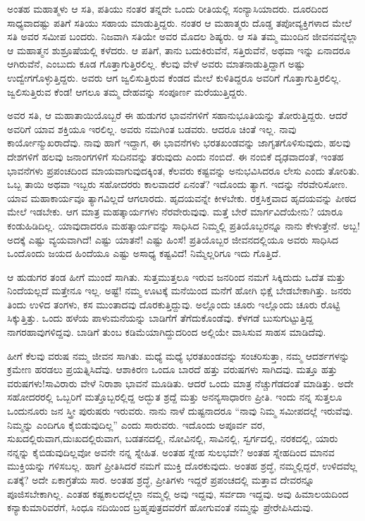 ಅಂತಹ ಮಹಾತ್ಮಳು ಆ ಸತಿ, ಪತಿಯು ನಂತರ ತನ್ನದೇ ಒಂದು ರೀತಿಯಲ್ಲಿ ಸಂನ್ಯಾಸಿಯಾದರು. ದೂರದಿಂದ ಸಾಧ್ಯವಾದಷ್ಟು ಪತಿಗೆ ಸತಿಯು ಸಹಾಯ ಮಾಡುತ್ತಿದ್ದರು. ನಂತರ ಆ ಮಹಾತ್ಮರು ದೊಡ್ಡ ತಪೋವ್ಯಕ್ತಿಗಳಾದ ಮೇಲೆ ಸತಿ ಅವರ ಸಮೀಪ ಬಂದರು. ನಿಜವಾಗಿ ಸತಿಯೇ ಅವರ ಮೊದಲ ಶಿಷ್ಯರು. ಆ ಸತಿ ತಮ್ಮ ಮುಂದಿನ ಜೀವನವನ್ನೆಲ್ಲಾ ಆ ಮಹಾತ್ಮನ ಶುಶ್ರೂಷೆಯಲ್ಲಿ ಕಳೆದರು. ಆ ಪತಿಗೆ, ತಾನು ಬದುಕಿರುವೆನೆ, ಸತ್ತಿರುವೆನೆ, ಅಥವಾ ಇನ್ನು ಏನಾದರೂ ಆಗಿರುವೆನೆ, ಎಂಬುದು ಕೂಡ ಗೊತ್ತಾಗುತ್ತಿರಲಿಲ್ಲ. ಕೆಲವು ವೇಳೆ ಅವರು ಮಾತನಾಡುತ್ತಿದ್ದಾಗ ಅಷ್ಟು ಉದ್ವೇಗಗೊಳ್ಳುತ್ತಿದ್ದರು. ಅವರು ಆಗ ಜ್ವಲಿಸುತ್ತಿರುವ ಕೆಂಡದ ಮೇಲೆ ಕುಳಿತಿದ್ದರೂ ಅವರಿಗೆ ಗೊತ್ತಾಗುತ್ತಿರಲಿಲ್ಲ. ಜ್ವಲಿಸುತ್ತಿರುವ ಕೆಂಡ! ಆಗಲೂ ತಮ್ಮ ದೇಹವನ್ನು ಸಂಪೂರ್ಣ ಮರೆಯುತ್ತಿದ್ದರು.

ಅವರ ಸತಿ, ಆ ಮಹಾತಾಯಿಯೊಬ್ಬರೆ ಈ ಹುಡುಗರ ಭಾವನೆಗಳಿಗೆ ಸಹಾನುಭೂತಿಯನ್ನು ತೋರುತ್ತಿದ್ದರು. ಆದರೆ ಅವರಿಗೆ ಯಾವ ಶಕ್ತಿಯೂ ಇರಲಿಲ್ಲ. ಅವರು ನಮಗಿಂತ ಬಡವರು. ಆದರೂ ಚಿಂತೆ ಇಲ್ಲ. ನಾವು ಕಾರ್ಯೋನ್ಮುಖರಾದೆವು. ನಾವು ಹಾಗೆ ಇದ್ದಾಗ, ಈ ಭಾವನೆಗಳು ಭರತಖಂಡವನ್ನು ಜಾಗೃತಗೊಳಿಸುವುದು, ಹಲವು ದೇಶಗಳಿಗೆ ಹಲವು ಜನಾಂಗಗಳಿಗೆ ಸುದಿನವನ್ನು ತರುವುದು ಎಂದು ನಂಬಿದೆ. ಈ ನಂಬಿಕೆ ದೃಢವಾದಂತೆ, ಇಂತಹ ಭಾವನೆಗಳು ಪ್ರಪಂಚದಿಂದ ಮಾಯವಾಗುವುದಕ್ಕಿಂತ, ಕೆಲವರು ಕಷ್ಟವನ್ನು ಅನುಭವಿಸಿದರೂ ಲೇಸು ಎಂದು ತೋರಿತು. ಒಬ್ಬ ತಾಯಿ ಅಥವಾ ಇಬ್ಬರು ಸಹೋದರರು ಕಾಲವಾದರೆ ಏನಂತೆ? ಇದೊಂದು ತ್ಯಾಗ. ಇದನ್ನು ನೆರವೇರಿಸೋಣ. ಯಾವ ಮಹಾಕಾರ್ಯವೂ ತ್ಯಾಗವಿಲ್ಲದೆ ಆಗಲಾರದು. ಹೃದಯವನ್ನೇ ಕೀಳಬೇಕು. ರಕ್ತಸಿಕ್ತವಾದ ಹೃದಯವನ್ನು ಪೀಠದ ಮೇಲೆ ಇಡಬೇಕು. ಆಗ ಮಾತ್ರ ಮಹತ್ಕಾರ್ಯಗಳು ನೆರವೇರುವುವು. ಮತ್ತೆ ಬೇರೆ ಮಾರ್ಗವಿದೆಯೇನು? ಯಾರೂ ಕಂಡುಹಿಡಿದಿಲ್ಲ. ಯಾವುದಾದರೂ ಮಹತ್ಕಾರ್ಯವನ್ನು ಸಾಧಿಸಿದ ನಿಮ್ಮಲ್ಲಿ ಪ್ರತಿಯೊಬ್ಬರನ್ನೂ ನಾನು ಕೇಳುತ್ತೇನೆ. ಅಬ್ಬ! ಅದಕ್ಕೆ ಎಷ್ಟು ವ್ಯಯವಾಗಿದೆ! ಎಷ್ಟು ಯಾತನೆ! ಎಷ್ಟು ಹಿಂಸೆ! ಪ್ರತಿಯೊಬ್ಬರ ಜೀವನದಲ್ಲಿಯೂ ಅವರು ಸಾಧಿಸಿದ ಒಂದೊಂದು ಜಯದ ಹಿಂದೆಯೂ ಎಷ್ಟು ಅಸಾಧ್ಯ ಕಷ್ಟವಿದೆ! ನಿಮ್ಮೆಲ್ಲರಿಗೂ ಇದು ಗೊತ್ತಿದೆ.

ಆ ಹುಡುಗರ ತಂಡ ಹೀಗೆ ಮುಂದೆ ಸಾಗಿತು. ಸುತ್ತಮುತ್ತಲೂ ಇರುವ ಜನರಿಂದ ನಮಗೆ ಸಿಕ್ಕಿದುದು ಒದೆತ ಮತ್ತು ನಿಂದೆಯಲ್ಲದೆ ಮತ್ತೇನೂ ಇಲ್ಲ. ಅಷ್ಟೆ! ನಮ್ಮ ಊಟಕ್ಕೆ ಮನೆಯಿಂದ ಮನೆಗೆ ಹೋಗಿ ಭಿಕ್ಷೆ ಬೇಡಬೇಕಾಗಿತ್ತು. ಜನರು ತಿಂದು ಉಳಿದ ತಂಗಳು, ಕಸ ಮುಂತಾದವು ದೊರಕುತ್ತಿದ್ದುವು. ಅಲ್ಲೊಂದು ಚೂರು ಇಲ್ಲೊಂದು ಚೂರು ರೊಟ್ಟಿ ಸಿಕ್ಕುತ್ತಿತ್ತು. ಒಂದು ಹಳೆಯ ಪಾಳುಮನೆಯನ್ನು ಬಾಡಿಗೆಗೆ ತೆಗೆದುಕೊಂಡೆವು. ಕೆಳಗಡೆ ಬುಸುಗುಟ್ಟುತ್ತಿದ್ದ ನಾಗರಹಾವುಗಳಿದ್ದವು. ಬಾಡಿಗೆ ತುಂಬ ಕಡಿಮೆಯಾಗಿದ್ದುದರಿಂದ ಅಲ್ಲಿಯೇ ವಾಸಿಸುವ ಸಾಹಸ ಮಾಡಿದೆವು.

\newpage

ಹೀಗೆ ಕೆಲವು ವರುಷ ನಮ್ಮ ಜೀವನ ಸಾಗಿತು. ಮಧ್ಯೆ ಮಧ್ಯೆ ಭರತಖಂಡವನ್ನು ಸಂಚರಿಸುತ್ತಾ, ನಮ್ಮ ಆದರ್ಶಗಳನ್ನು ಕ್ರಮೇಣ ಹರಡಲು ಪ್ರಯತ್ನಿಸಿದೆವು. ಆಶಾಕಿರಣ ಒಂದೂ ಬಾರದೆ ಹತ್ತು ವರುಷಗಳು ಸಾಗಿದವು. ಮತ್ತೂ ಹತ್ತು ವರುಷಗಳು!ಸಾವಿರಾರು ವೇಳೆ ನಿರಾಶಾ ಭಾವನೆ ಮೂಡಿತು. ಆದರೆ ಒಂದು ಮಾತ್ರ ನೆಚ್ಚುಗೆಡದಂತೆ ಮಾಡಿತ್ತು. ಅದೇ ಸಹೋದರರಲ್ಲಿ ಒಬ್ಬರಿಗೆ ಮತ್ತೊಬ್ಬರಲ್ಲಿದ್ದ ಅದ್ಭುತ ಶ್ರದ್ದೆ ಮತ್ತು ಅನನ್ಯಸಾಧಾರಣ ಪ್ರೀತಿ. ಇಂದು ನನ್ನ ಸುತ್ತಲೂ ಒಂದುನೂರು ಜನ ಸ್ತ್ರೀ ಪುರುಷರು ಇರುವರು. ನಾನು ನಾಳೆ ದುಷ್ಟನಾದರೂ “ನಾವು ನಿಮ್ಮ ಸಮೀಪದಲ್ಲೆ ಇರುವೆವು. ನಿಮ್ಮನ್ನು ಎಂದಿಗೂ ಕೈಬಿಡುವುದಿಲ್ಲ” ಎಂದು ಸಾರುವರು. ಇದೊಂದು ಅಪೂರ್ವ ವರ, ಸುಖದಲ್ಲಿರುವಾಗ,\break ದುಃಖದಲ್ಲಿರುವಾಗ, ಬಡತನದಲ್ಲಿ, ನೋವಿನಲ್ಲಿ, ಸಾವಿನಲ್ಲಿ, ಸ್ವರ್ಗದಲ್ಲಿ, ನರಕದಲ್ಲಿ, ಯಾರು ನನ್ನನ್ನು ಕೈಬಿಡುವುದಿಲ್ಲವೋ ಅವನೇ ನನ್ನ ಸ್ನೇಹಿತ. ಅಂತಹ ಸ್ನೇಹ ಸುಲಭವೇ? ಅಂತಹ ಸ್ನೇಹದಿಂದ ಮಾನವ ಮುಕ್ತಿಯನ್ನು ಗಳಿಸಬಲ್ಲ. ಹಾಗೆ ಪ್ರೀತಿಸಿದರೆ ನಮಗೆ ಮುಕ್ತಿ ದೊರಕುವುದು. ಅಂತಹ ಶ್ರದ್ಧೆ, ನಮ್ಮಲ್ಲಿದ್ದರೆ, ಉಳಿದವೆಲ್ಲ ಏತಕ್ಕೆ? ಅದೇ ಏಕಾಗ್ರತೆಯ ಸಾರ. ಅಂತಹ ಶ್ರದ್ಧೆ, ಪ್ರೀತಿಗಳು ಇದ್ದರೆ ಪ್ರಪಂಚದಲ್ಲಿ ಮತ್ತಾವ ದೇವರನ್ನೂ ಪೂಜಿಸಬೇಕಾಗಿಲ್ಲ. ಎಂತಹ ಕಷ್ಟಕಾಲದಲ್ಲೆಲ್ಲಾ ನಮ್ಮಲ್ಲಿ ಅವು ಇದ್ದವು, ಸರ್ವದಾ ಇದ್ದವು. ಅವು ಹಿಮಾಲಯದಿಂದ ಕನ್ಯಾಕುಮಾರಿವರೆಗೆ, ಸಿಂಧೂ ನದಿಯಿಂದ ಬ್ರಹ್ಮಪುತ್ರದವರೆಗೆ ಹೋಗುವಂತೆ ನಮ್ಮನ್ನು ಪ್ರೇರೇಪಿಸಿದುವು.

